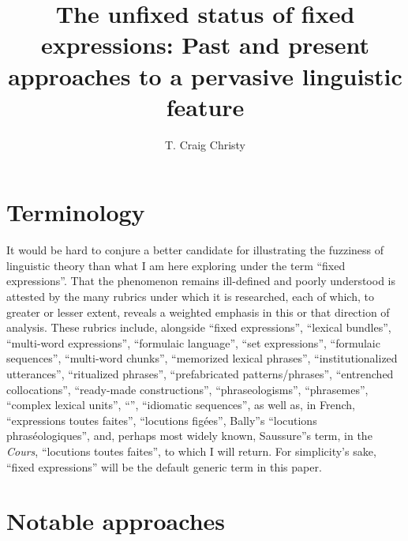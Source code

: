 \documentclass[english,output=paper,colorlinks,citecolor=brown]{../langscibook}
\author{T. Craig Christy\affiliation{University of North Alabama}\orcid{}}
\title{The unfixed status of fixed expressions: Past and present approaches to a pervasive linguistic feature}
\begin{document}
\maketitle

\section{Terminology}

It would be hard to conjure a better candidate for illustrating the fuzziness of linguistic theory than what I am here exploring under the term ``fixed expressions''. That the phenomenon remains ill-defined and poorly understood is attested by the many rubrics under which it is researched, each of which, to greater or lesser extent, reveals a weighted emphasis in this or that direction of analysis. These rubrics include, alongside ``fixed expressions'', ``lexical bundles'', ``multi-word expressions'', ``formulaic language'', ``set expressions'', ``formulaic sequences'', ``mul\-ti-word chunks'', ``memorized lexical phrases'', ``institutionalized utterances'', ``ritualized phrases'', ``prefabricated patterns/phrases'', ``entrenched collocations'', ``ready-made constructions'', ``phraseologisms'', ``phrasemes'', ``complex lexical units'', ``'', ``idiomatic sequences'', as well as, in French, ``expressions toutes faites'', ``locutions figées'', Bally''s ``locutions phraséologiques'', and, perhaps most widely known, Saussure''s term, in the \textit{Cours}, ``locutions toutes faites'', to which I will return. For simplicity's sake, ``fixed expressions'' will be the default generic term in this paper. 

\section{Notable approaches}
\end{document}
